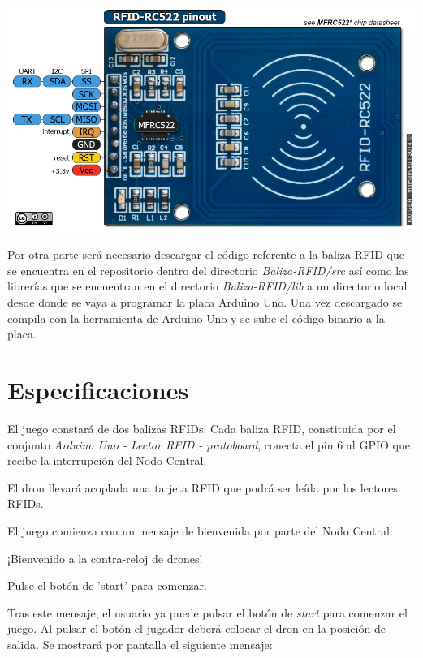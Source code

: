        
     
         \includegraphics[scale=1,
         keepaspectratio]{./Figures/rfid-rc522-pinout.png}
   

Por otra parte será necesario descargar el código referente a la baliza RFID que se encuentra en el repositorio dentro del directorio \textit{Baliza-RFID/src} así como las librerías que se encuentran en el directorio \textit {Baliza-RFID/lib} a un directorio local desde donde se vaya a programar la placa Arduino Uno. Una vez descargado se compila con la herramienta de Arduino Uno y se sube el código binario a la placa.

\section{Especificaciones}
El juego constará de dos balizas RFIDs.  Cada baliza RFID, constituida por el conjunto \textit{Arduino Uno - Lector RFID - protoboard}, conecta el pin 6 al GPIO que recibe la interrupción del Nodo Central. 

El dron llevará acoplada una tarjeta RFID que podrá ser leída por los lectores RFIDs.
  
El juego comienza con un mensaje de bienvenida por parte del Nodo Central:
    \begin{description}
    		\item \hspace{10mm} ¡Bienvenido a la contra-reloj de drones!  
    		\item \hspace{10mm} Pulse el botón de 'start' para comenzar.
	\end{description}

Tras este mensaje, el usuario ya puede pulsar el botón de \textit{start} para comenzar el juego. Al pulsar el botón el jugador deberá colocar el dron en la posición de salida. Se mostrará por pantalla el siguiente mensaje:

